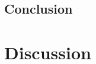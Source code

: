 \documentclass[12pt]{article}
\begin{document}
\subsection{Conclusion}



\section{Discussion}
\end{document}
